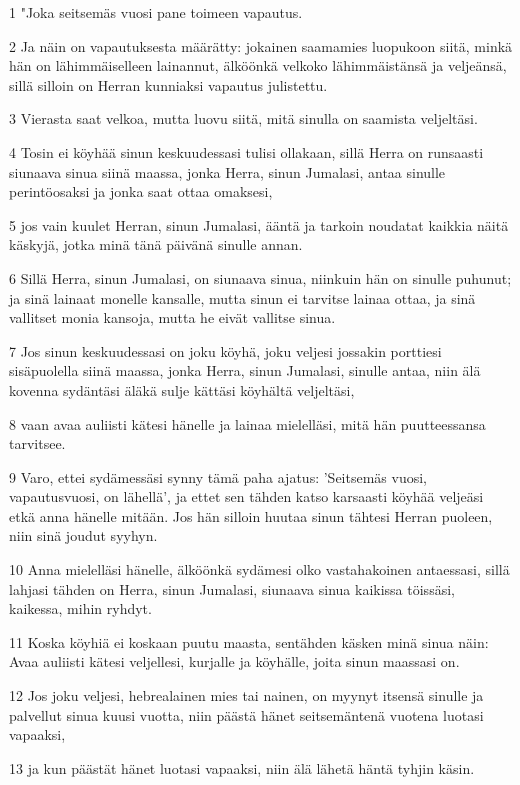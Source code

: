 \par 1 "Joka seitsemäs vuosi pane toimeen vapautus.
\par 2 Ja näin on vapautuksesta määrätty: jokainen saamamies luopukoon siitä, minkä hän on lähimmäiselleen lainannut, älköönkä velkoko lähimmäistänsä ja veljeänsä, sillä silloin on Herran kunniaksi vapautus julistettu.
\par 3 Vierasta saat velkoa, mutta luovu siitä, mitä sinulla on saamista veljeltäsi.
\par 4 Tosin ei köyhää sinun keskuudessasi tulisi ollakaan, sillä Herra on runsaasti siunaava sinua siinä maassa, jonka Herra, sinun Jumalasi, antaa sinulle perintöosaksi ja jonka saat ottaa omaksesi,
\par 5 jos vain kuulet Herran, sinun Jumalasi, ääntä ja tarkoin noudatat kaikkia näitä käskyjä, jotka minä tänä päivänä sinulle annan.
\par 6 Sillä Herra, sinun Jumalasi, on siunaava sinua, niinkuin hän on sinulle puhunut; ja sinä lainaat monelle kansalle, mutta sinun ei tarvitse lainaa ottaa, ja sinä vallitset monia kansoja, mutta he eivät vallitse sinua.
\par 7 Jos sinun keskuudessasi on joku köyhä, joku veljesi jossakin porttiesi sisäpuolella siinä maassa, jonka Herra, sinun Jumalasi, sinulle antaa, niin älä kovenna sydäntäsi äläkä sulje kättäsi köyhältä veljeltäsi,
\par 8 vaan avaa auliisti kätesi hänelle ja lainaa mielelläsi, mitä hän puutteessansa tarvitsee.
\par 9 Varo, ettei sydämessäsi synny tämä paha ajatus: 'Seitsemäs vuosi, vapautusvuosi, on lähellä', ja ettet sen tähden katso karsaasti köyhää veljeäsi etkä anna hänelle mitään. Jos hän silloin huutaa sinun tähtesi Herran puoleen, niin sinä joudut syyhyn.
\par 10 Anna mielelläsi hänelle, älköönkä sydämesi olko vastahakoinen antaessasi, sillä lahjasi tähden on Herra, sinun Jumalasi, siunaava sinua kaikissa töissäsi, kaikessa, mihin ryhdyt.
\par 11 Koska köyhiä ei koskaan puutu maasta, sentähden käsken minä sinua näin: Avaa auliisti kätesi veljellesi, kurjalle ja köyhälle, joita sinun maassasi on.
\par 12 Jos joku veljesi, hebrealainen mies tai nainen, on myynyt itsensä sinulle ja palvellut sinua kuusi vuotta, niin päästä hänet seitsemäntenä vuotena luotasi vapaaksi,
\par 13 ja kun päästät hänet luotasi vapaaksi, niin älä lähetä häntä tyhjin käsin.
